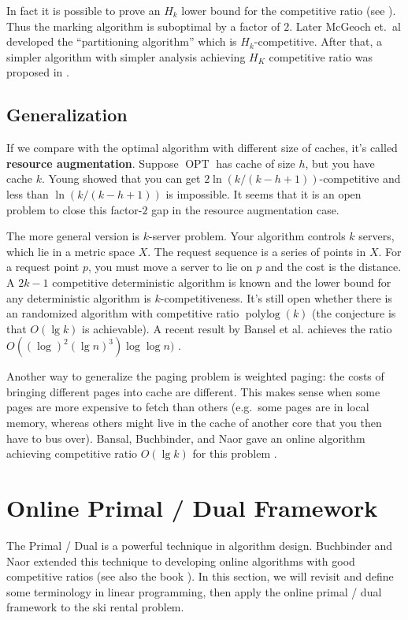 \documentclass[11pt]{article}
\DeclareMathOperator{\opt}{OPT}
\def\polylog{\operatorname{polylog}}
\begin{document}
In fact it is possible to prove an $H_k$ lower bound for the competitive ratio (see \cite{fiat1991competitive}). Thus the marking algorithm is suboptimal by a factor of $2$. Later McGeoch et.\ al developed the ``partitioning algorithm'' \cite{mcgeoch1991strongly} which is $H_k$-competitive. After that, a simpler algorithm with simpler analysis achieving $H_K$ competitive ratio was proposed in \cite{achlioptas2000competitive}.

\subsection{Generalization}
If we compare with the optimal algorithm with different size of caches, it's called \textbf{resource augmentation}.
Suppose $\opt$ has cache of size $h$, but you have cache $k$.
Young \cite{young1991line} showed that you can get $2\ln(k/(k-h+1))$-competitive and less than $\ln(k/(k-h+1))$ is impossible. It seems that it is an open problem to close this factor-$2$ gap in the resource augmentation case.

The more general version is $k$-server problem.
Your algorithm controls $k$ servers, which lie in a metric space $X$.
The request sequence is a series of points in $X$.
For a request point $p$, you must move a server to lie on $p$ and the cost is the distance.
A $2k-1$ competitive deterministic algorithm is known \cite{koutsoupias1995k} and the lower bound for any deterministic algorithm is $k$-competitiveness.
It's still open whether there is an randomized algorithm with competitive ratio $\polylog(k)$ (the conjecture is that $O(\lg k)$ is achievable).
A recent result by Bansel et al. achieves the ratio $O((\log)^2(\lg n)^3)\log\log n)$ \cite{bansal2011polylogarithmic}.

Another way to generalize the paging problem is weighted paging: the costs of bringing different pages into cache are different. This makes sense when some pages are more expensive to fetch than others (e.g.\ some pages are in local memory, whereas others might live in the cache of another core that you then have to bus over). Bansal, Buchbinder, and Naor gave an online algorithm achieving competitive ratio $O(\lg k)$ for this problem \cite{BansalBN12}.

\section{Online Primal / Dual Framework}
The Primal / Dual is a powerful technique in algorithm design.
Buchbinder and Naor extended this technique to developing online algorithms with good competitive ratios \cite{buchbinder2005online} (see also the book \cite{BuchbinderN09}). In this section, we will revisit and define some terminology in linear programming, then apply the online primal / dual framework to the ski rental problem.
\end{document}
